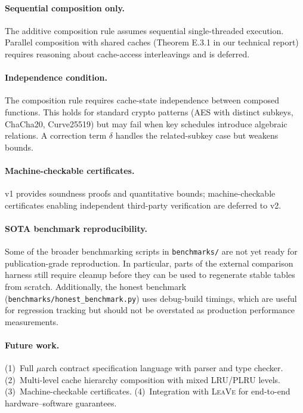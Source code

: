 \documentclass{article}
\theoremstyle{definition}
\theoremstyle{remark}
\begin{document}
\paragraph{Sequential composition only.}
The additive composition rule assumes sequential single-threaded execution.
Parallel composition with shared caches (Theorem E.3.1 in our technical report)
requires reasoning about cache-access interleavings and is deferred.

\paragraph{Independence condition.}
The composition rule requires cache-state independence between composed
functions.  This holds for standard crypto patterns (AES with distinct subkeys,
ChaCha20, Curve25519) but may fail when key schedules introduce algebraic
relations.  A correction term $\delta$ handles the related-subkey case but
weakens bounds.

\paragraph{Machine-checkable certificates.}
v1 provides soundness proofs and quantitative bounds; machine-checkable
certificates enabling independent third-party verification are deferred to v2.

\paragraph{SOTA benchmark reproducibility.}
Some of the broader benchmarking scripts in \texttt{benchmarks/} are not yet
ready for publication-grade reproduction. In particular, parts of the external
comparison harness still require cleanup before they can be used to regenerate
stable tables from scratch. Additionally, the honest benchmark
(\texttt{benchmarks/honest\_benchmark.py}) uses debug-build timings, which are
useful for regression tracking but should not be overstated as production
performance measurements.

\paragraph{Future work.}
(1)~Full $\mu$arch contract specification language with parser and type checker.
(2)~Multi-level cache hierarchy composition with mixed LRU/PLRU levels.
(3)~Machine-checkable certificates.  (4)~Integration with \textsc{LeaVe} for
end-to-end hardware--software guarantees.
\end{document}
